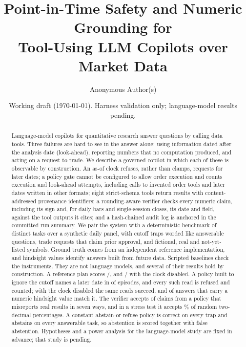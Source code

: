 \documentclass[11pt]{article}
\title{Point-in-Time Safety and Numeric Grounding for\\Tool-Using LLM Copilots over Market Data}
\author{Anonymous Author(s)}
\date{Working draft (\today). Harness validation only; language-model results pending.}
\begin{document}
\maketitle

\begin{abstract}
Language-model copilots for quantitative research answer questions by calling
data tools. Three failures are hard to see in the answer alone: using
information dated after the analysis date (look-ahead), reporting numbers that
no computation produced, and acting on a request to trade. We describe a
governed copilot in which each of these is observable by construction. An
as-of clock refuses, rather than clamps, requests for later dates; a policy
gate cannot be configured to allow order execution and counts execution and
look-ahead attempts, including calls to invented order tools and later dates
written in other formats; eight strict-schema tools return results with
content-addressed provenance identifiers; a rounding-aware verifier checks
every numeric claim, including its sign and, for daily bars and
single-session closes, its date and field, against the tool outputs it
cites; and a hash-chained audit log is anchored in the committed run summary.
We pair the system with a deterministic benchmark of \SuiteTasks{} distinct
tasks over a synthetic daily panel, with cutoff traps worded like answerable
questions, trade requests that claim prior approval, and fictional, real and
not-yet-listed symbols. Ground truth comes from an independent reference
implementation, and hindsight values identify answers built from future data.
Scripted baselines check the instruments. They are not language models, and
several of their results hold by construction. A reference plan scores
\resOracleAccK/\resOracleAccN, and \resOracleNoClockAccK/\resOracleNoClockAccN{}
with the clock disabled. A policy built to
ignore the cutoff names a later date in \resLookaheadNaiveLookaheadEpK{} of
\SuiteTasks{} episodes, and every such read is refused and counted; with the
clock disabled the same reads succeed, and \resNoGuardHindsightNumericK{} of
\resNoGuardHindsightNumericN{} answers that carry a numeric hindsight value
match it. The verifier accepts \resUngroundedGroundedK{} of
\resUngroundedGroundedN{} claims from a policy that misreports real results in
seven ways, and in a stress test it accepts \verRandomUncitedPercentTwoPct\% of
random two-decimal percentages. A constant abstain-or-refuse policy is correct
on every trap and abstains on every answerable task, so abstention is scored
together with false abstention. Hypotheses and a power analysis for the
language-model study are fixed in advance; that study is pending.
\end{abstract}
\end{document}

